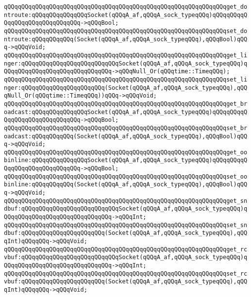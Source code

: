 \verb|qQQqqQQqqQQqqQQqqQQqqQQqqQQqqQQqqQQqqQQqqQQqqQQqqQQqqQQqqQQqqQQqget_dontroute:qQQqqQQqqQQqqQQqSocket(qQQqA_af,qQQqA_sock_typeqQQq)qQQqqQQqqQQqqQQqqQQqqQQqqQQqqQQq->qQQqBool;|\newline
\verb|qQQqqQQqqQQqqQQqqQQqqQQqqQQqqQQqqQQqqQQqqQQqqQQqqQQqqQQqqQQqqQQqset_dontroute:qQQqqQQqqQQq(Socket(qQQqA_af,qQQqA_sock_typeqQQq),qQQqBool)qQQq->qQQqVoid;|\newline
\verb|qQQqqQQqqQQqqQQqqQQqqQQqqQQqqQQqqQQqqQQqqQQqqQQqqQQqqQQqqQQqqQQqget_linger:qQQqqQQqqQQqqQQqqQQqqQQqqQQqSocket(qQQqA_af,qQQqA_sock_typeqQQq)qQQqqQQqqQQqqQQqqQQqqQQqqQQqqQQq->qQQqNull_Or(qQQqtime::TimeqQQq);|\newline
\verb|qQQqqQQqqQQqqQQqqQQqqQQqqQQqqQQqqQQqqQQqqQQqqQQqqQQqqQQqqQQqqQQqset_linger:qQQqqQQqqQQqqQQqqQQqqQQq(Socket(qQQqA_af,qQQqA_sock_typeqQQq),qQQqNull_Or(qQQqtime::TimeqQQq))qQQq->qQQqVoid;|\newline
\verb|qQQqqQQqqQQqqQQqqQQqqQQqqQQqqQQqqQQqqQQqqQQqqQQqqQQqqQQqqQQqqQQqget_broadcast:qQQqqQQqqQQqqQQqSocket(qQQqA_af,qQQqA_sock_typeqQQq)qQQqqQQqqQQqqQQqqQQqqQQqqQQqqQQq->qQQqBool;|\newline
\verb|qQQqqQQqqQQqqQQqqQQqqQQqqQQqqQQqqQQqqQQqqQQqqQQqqQQqqQQqqQQqqQQqset_broadcast:qQQqqQQqqQQq(Socket(qQQqA_af,qQQqA_sock_typeqQQq),qQQqBool)qQQq->qQQqVoid;|\newline
\verb|qQQqqQQqqQQqqQQqqQQqqQQqqQQqqQQqqQQqqQQqqQQqqQQqqQQqqQQqqQQqqQQqget_oobinline:qQQqqQQqqQQqqQQqSocket(qQQqA_af,qQQqA_sock_typeqQQq)qQQqqQQqqQQqqQQqqQQqqQQqqQQqqQQq->qQQqBool;|\newline
\verb|qQQqqQQqqQQqqQQqqQQqqQQqqQQqqQQqqQQqqQQqqQQqqQQqqQQqqQQqqQQqqQQqset_oobinline:qQQqqQQqqQQq(Socket(qQQqA_af,qQQqA_sock_typeqQQq),qQQqBool)qQQq->qQQqVoid;|\newline
\verb|qQQqqQQqqQQqqQQqqQQqqQQqqQQqqQQqqQQqqQQqqQQqqQQqqQQqqQQqqQQqqQQqget_sndbuf:qQQqqQQqqQQqqQQqqQQqqQQqqQQqSocket(qQQqA_af,qQQqA_sock_typeqQQq)qQQqqQQqqQQqqQQqqQQqqQQqqQQqqQQq->qQQqInt;|\newline
\verb|qQQqqQQqqQQqqQQqqQQqqQQqqQQqqQQqqQQqqQQqqQQqqQQqqQQqqQQqqQQqqQQqset_sndbuf:qQQqqQQqqQQqqQQqqQQqqQQq(Socket(qQQqA_af,qQQqA_sock_typeqQQq),qQQqInt)qQQqqQQq->qQQqVoid;|\newline
\verb|qQQqqQQqqQQqqQQqqQQqqQQqqQQqqQQqqQQqqQQqqQQqqQQqqQQqqQQqqQQqqQQqget_rcvbuf:qQQqqQQqqQQqqQQqqQQqqQQqqQQqSocket(qQQqA_af,qQQqA_sock_typeqQQq)qQQqqQQqqQQqqQQqqQQqqQQqqQQqqQQq->qQQqInt;|\newline
\verb|qQQqqQQqqQQqqQQqqQQqqQQqqQQqqQQqqQQqqQQqqQQqqQQqqQQqqQQqqQQqqQQqset_rcvbuf:qQQqqQQqqQQqqQQqqQQqqQQq(Socket(qQQqA_af,qQQqA_sock_typeqQQq),qQQqInt)qQQqqQQq->qQQqVoid;|\newline
